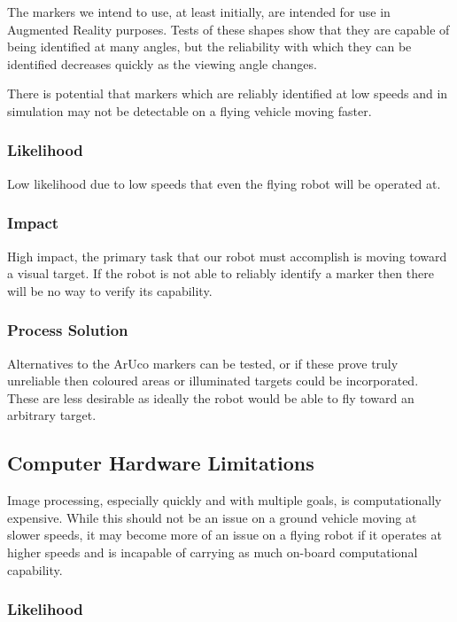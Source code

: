 \documentclass{article}
\begin{document}
	The markers we intend to use, at least initially, are intended for use in Augmented Reality purposes. Tests of these shapes show that they are capable of being identified at many angles, but the reliability with which they can be identified decreases quickly as the viewing angle changes. 
	
	There is potential that markers which are reliably identified at low speeds and in simulation may not be detectable on a flying vehicle moving faster.
	
		\subsubsection{Likelihood}
		
		Low likelihood due to low speeds that even the flying robot will be operated at.
		
		\subsubsection{Impact}
		
		High impact, the primary task that our robot must accomplish is moving toward a visual target. If the robot is not able to reliably identify a marker then there will be no way to verify its capability.
		
		\subsubsection{Process Solution}
		
		Alternatives to the ArUco markers can be tested, or if these prove truly unreliable then coloured areas or illuminated targets could be incorporated. These are less desirable as ideally the robot would be able to fly toward an arbitrary target.
		
	\subsection{Computer Hardware Limitations}
	
	Image processing, especially quickly and with multiple goals, is computationally expensive. While this should not be an issue on a ground vehicle moving at slower speeds, it may become more of an issue on a flying robot if it operates at higher speeds and is incapable of carrying as much on-board computational capability.
	
		\subsubsection{Likelihood}
		
\end{document}

